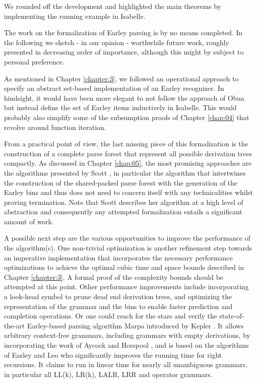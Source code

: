 \begin{isabellebody}
\begin{isamarkuptext}
We rounded off the development and highlighted the main theorems by implementing the running example
in Isabelle.%
\end{isamarkuptext}\isamarkuptrue%
%
\isadelimdocument
%
\endisadelimdocument
%
\isatagdocument
%
\isamarkuptrue%
%
\endisatagdocument
{\isafolddocument}%
%
\isadelimdocument
%
\endisadelimdocument
%
\begin{isamarkuptext}%
The work on the formalization of Earley parsing is by no means completed. In the following
we sketch - in our opinion - worthwhile future work, roughly presented in decreasing order of importance,
although this might by subject to personal preference.

As mentioned in Chapter \ref{chapter:3}, we followed an operational approach to specify an abstract
set-based implementation of an Earley recognizer. In hindsight, it would have been more elegant to not
follow the approach of Obua but instead define the set of Earley items inductively in Isabelle. This
would probably also simplify some of the subsumption proofs of Chapter \ref{chap:04} that revolve around
function iteration.

From a practical point of view, the last missing piece of this formalization is the construction of a
complete parse forest that represent all possible derivation trees compactly. As discussed in Chapter \ref{chap:05},
the most promising approaches are the algorithms presented by Scott \cite{Scott:2008}, in particular
the algorithm that intertwines the construction of the shared-packed parse forest with the generation of
the Earley bins and thus does not need to concern itself with any technicalities whilst proving termination.
Note that Scott describes her algorithm at a high level of abstraction and consequently any attempted
formalization entails a significant amount of work.

A possible next step are the various opportunities to improve the performance of the algorithm(s).
One non-trivial optimization is another refinement step towards an imperative implementation that incorporates the
necessary performance optimizations to achieve the optimal cubic time and space bounds described in
Chapter \ref{chapter:3}. A formal proof of the complexity bounds should be attempted at this point.
Other performance improvements include incorporating a look-head symbol to prune dead end derivation
trees, and optimizing the representation of the grammar and the bins to enable faster prediction and
completion operations. Or one could reach for the stars and verify the state-of-the-art Earley-based
parsing algorithm Marpa introduced by Kepler \cite{Kegler:2023}. It allows arbitrary context-free
grammars, including grammars with empty derivations, by incorporating the work of Aycock and Horspool \cite{Aycock:2002},
and is based on the algorithms of Earley \cite{Earley:1970} and Leo \cite{Leo:1991} who significantly improves
the running time for right recursions. It claims to run in linear time for nearly all unambiguous grammars,
in particular all LL(k), LR(k), LALR, LRR and operator grammars.


\end{isamarkuptext}
\end{isabellebody}
